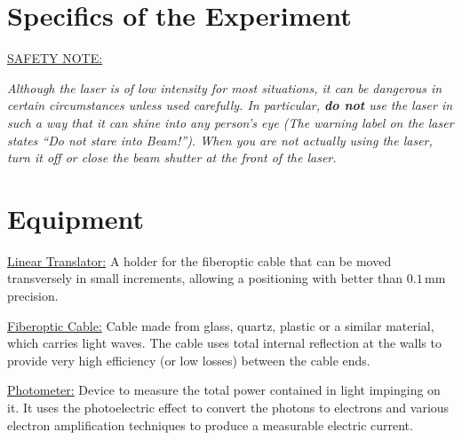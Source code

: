 \section{Specifics of the Experiment}
\underline{SAFETY NOTE:}

\emph{Although the laser is of low intensity for most situations, it can be dangerous in certain circumstances unless used carefully. In particular, \textbf{do not} use the laser in such a way that it can shine into any person's eye (The warning label on the laser states ``Do not stare into Beam!''). When you are not actually using the laser, turn it off or close the beam shutter at the front of the laser.}

\section{Equipment}
\indent\indent\underline{Linear Translator:}
A holder for the fiberoptic cable that can be moved transversely in small increments, allowing a positioning with better than $0.1\,\mathrm{mm}$ precision. \myskip

\underline{Fiberoptic Cable:}
Cable made from glass, quartz, plastic or a similar material, which carries light waves. The cable uses total internal reflection at the walls to provide very high efficiency (or low losses) between the cable ends.\myskip

\underline{Photometer:}
Device to measure the total power contained in light impinging on it. It uses the photoelectric effect to convert the photons to electrons and various electron amplification techniques to produce a measurable electric current.

